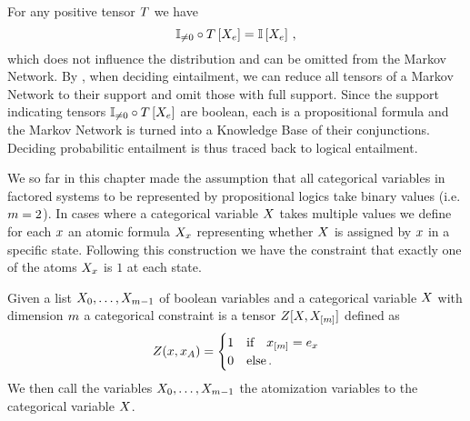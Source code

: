 For any positive tensor $T$ we have
	\[ \mathbb{I}_{\neq0}\circ T\left[X_{e}\right] = \mathbb{I}\left[X_{e}\right] \, , \]
which does not influence the distribution and can be omitted from the Markov Network.
By , when deciding eintailment, we can reduce all tensors of a Markov Network to their support and omit those with full support.
Since the support indicating tensors $\mathbb{I}_{\neq0}\circ T\left[X_{e}\right]$ are boolean, each is a propositional formula and the Markov Network is turned into a Knowledge Base of their conjunctions.
Deciding probabilitic entailment is thus traced back to logical entailment.


\label{sec:categoricalTN}

We so far in this chapter made the assumption that all categorical variables in factored systems to be represented by propositional logics take binary values (i.e. $m=2$).
In cases where a categorical variable $X$ takes multiple values we define for each $x$ an atomic formula $X_{x}$ representing whether $X$ is assigned by $x$ in a specific state.
Following this construction we have the constraint that exactly one of the atoms $X_{x}$ is $1$ at each state.



\begin{definition}
	Given a list $X_{0},\ldots,X_{m-1}$ of boolean variables and a categorical variable $X$ with dimension $m$ a categorical constraint is a tensor $Z[X,X_{[m]}]$ defined as
	\begin{align*}
		 Z(x,x_{A})
		 = \begin{cases}
		 	1 & \text{if} \quad x_{[m]} = e_{x} \\
			0 & \text{else} \, .
		 \end{cases}
	\end{align*}
	We then call the variables  $X_{0},\ldots,X_{m-1}$ the atomization variables to the categorical variable $X$.
\end{definition}

